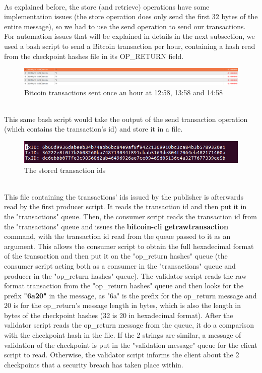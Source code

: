 \\
As explained before, the store (and retrieve) operations have some implementation issues (the store operation does only send the first 32 bytes of the entire message), so we had to use the send operation to send our transactions. For automation issues that will be explained in details in the next subsection, we used a bash script to send a Bitcoin transaction per hour, containing a hash read from the checkpoint hashes file in its OP\_RETURN field.\\
\begin{figure}[htp]
    \centering
    \includegraphics[scale=0.42]{out1}
    \caption{Bitcoin transactions sent once an hour at 12:58, 13:58 and 14:58}
\end{figure}
\\
This same bash script would take the output of the send transaction operation (which contains the transaction's id) and store it in a file.
\begin{figure}[htp]
    \centering
    \includegraphics[scale=0.42]{txs}
    \caption{The stored transaction ids}
\end{figure}
\\
This file containing the transactions' ids issued by the publisher is afterwards read by the first producer script. It reads the transaction id and then put it in the "transactions" queue. Then, the consumer script reads the transaction id from the "transactions" queue and issues the \textbf{bitcoin-cli getrawtransaction} command, with the transaction id read from the queue passed to it as an argument. This allows the consumer script to obtain the full hexadecimal format of the transaction and then put it on the "op\_return hashes" queue (the consumer script acting both as a consumer in the "transactions" queue and producer in the "op\_return hashes" queue). The validator script reads the raw format transaction from the "op\_return hashes" queue and then looks for the prefix \textbf{"6a20"} in the message, as "6a" is the prefix for the op\_return message and 20 is for the op\_return's message length in bytes, which is also the length in bytes of the checkpoint hashes (32 is 20 in hexadecimal format). After the validator script reads the op\_return message from the queue, it do a comparison with the checkpoint hash in the file. If the 2 strings are similar, a message of validation of the checkpoint is put in the "validation message" queue for the client script to read. Otherwise, the validator script informs the client about the 2 checkpoints that a security breach has taken place within.  
